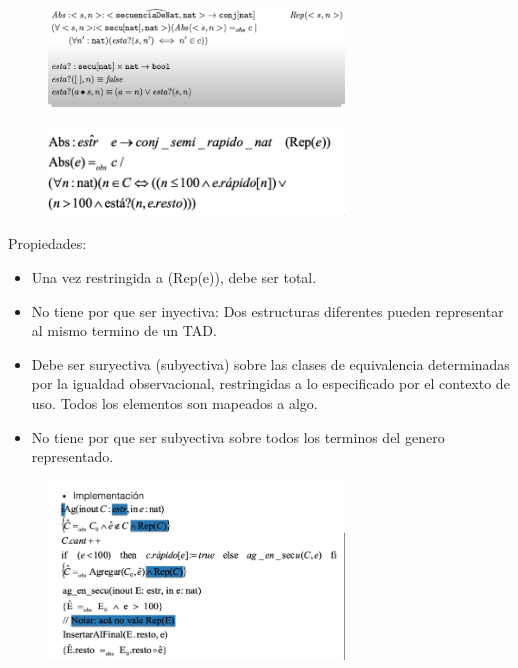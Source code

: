 \documentclass[11pt]{article}
\begin{document}
\begin{figure}[h!]
    \centering
    \includegraphics[width=0.7\textwidth]{absEj.png}
\end{figure}

\begin{figure}[h!]
    \centering
    \includegraphics[width=0.7\textwidth]{abs2.png}
\end{figure}

Propiedades:
\begin{itemize}
    \item Una vez restringida a (Rep(e)), debe ser total.
    \item No tiene por que ser inyectiva: Dos estructuras diferentes
        pueden representar al mismo termino de un TAD.
    \item Debe ser suryectiva (subyectiva) sobre las clases de equivalencia determinadas
        por la igualdad observacional, restringidas a lo especificado por el contexto
        de uso. Todos los elementos son mapeados a algo.
    \item No tiene por que ser subyectiva sobre todos los terminos del genero
        representado.
\end{itemize}


\begin{figure}[h!]
    \centering
    \includegraphics[width=0.7\textwidth]{algo.png}
\end{figure}
\end{document}
